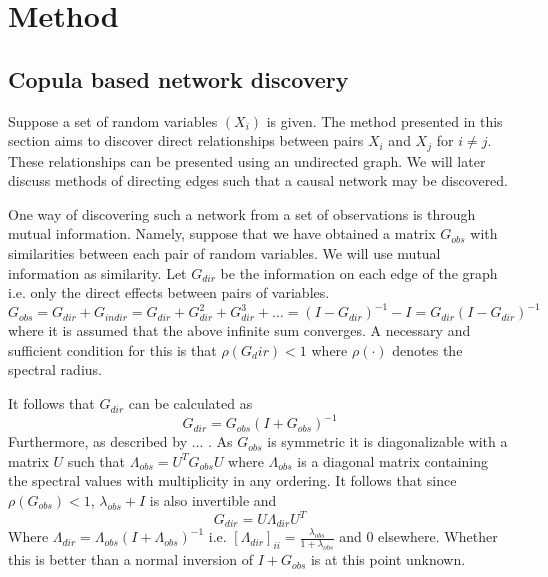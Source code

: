 \documentclass[../Thesis.tex]{subfiles}
\begin{document}
\chapter{Method}

\section{Copula based network discovery}
Suppose a set of random variables $(X_i)$ is given. The method presented in this section aims to discover direct relationships between pairs $X_i$ and $X_j$ for $i\neq j$. These relationships can be presented using an undirected graph. We will later discuss methods of directing edges such that a causal network may be discovered.

One way of discovering such a network from a set of observations is through mutual information. Namely, suppose that we have obtained a matrix $G_{obs}$ with similarities between each pair of random variables. We will use mutual information as similarity. Let $G_{dir}$ be the information on each edge of the graph i.e. only the direct effects between pairs of variables.
$$G_{obs} = G_{dir} + G_{indir} = G_{dir} + G_{dir}^2 + G_{dir}^3 + \dots = \left(I - G_{dir}\right)^{-1} - I = G_{dir} \left(I - G_{dir}\right)^{-1}$$
where it is assumed that the above infinite sum converges. A necessary and sufficient condition for this is that $\rho \left(G_dir\right) < 1$ where $\rho\left( \cdot \right)$ denotes the spectral radius.

It follows that $G_{dir}$ can be calculated as
$$G_{dir} = G_{obs} \left(I + G_{obs}\right)^{-1}$$
Furthermore, as described by ... . As $G_{obs}$ is symmetric it is diagonalizable with a matrix $U$ such that $\Lambda_{obs} = U^T G_{obs} U$ where $\Lambda_{obs}$ is a diagonal matrix containing the spectral values with multiplicity in any ordering. It follows that since $\rho\left(G_{obs}\right) < 1$, $\lambda_{obs} + I$ is also invertible and
$$G_{dir} = U \Lambda_{dir} U^T$$
Where $\Lambda_{dir} = \Lambda_{obs} \left(I + \Lambda_{obs}\right)^{-1}$ i.e. $\left[\Lambda_{dir}\right]_{ii} = \frac{\lambda_{obs}}{1 + \lambda_{obs}}$ and $0$ elsewhere. Whether this is better than a normal inversion of $I + G_{obs}$ is at this point unknown.
\end{document}
